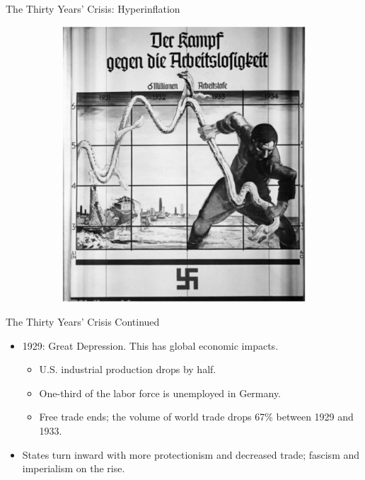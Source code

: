 \documentclass[handout]{beamer}
\begin{document}
\begin{frame}{\LARGE The Thirty Years' Crisis: Hyperinflation}
\begin{figure}
\begin{subfigure}{0.49\textwidth}
			\includegraphics[width = \textwidth, height=.9\textheight]{Hitlervsinflation.png}
		\end{subfigure}
	\end{figure}
\end{frame}

\begin{frame}{\LARGE The Thirty Years' Crisis Continued}
	\begin{itemize}
		\item 1929: Great Depression. This has global economic impacts.
		\begin{itemize}
			\item U.S. industrial production drops by half.
			\item One-third of the labor force is unemployed in Germany.
			\item Free trade ends; the volume of world trade drops 67\% between 1929 and 1933.			
		\end{itemize}
		\item States turn inward with more protectionism and decreased trade; fascism and imperialism on the rise.
	\end{itemize}
\end{frame}
\end{document}
